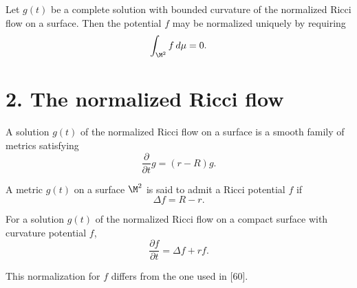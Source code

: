 \begin{lemma}
\label{ch05-lem-potential-normalization}

Let \(g(t)\) be a complete solution with bounded curvature of the normalized Ricci flow on a surface. Then the potential \(f\) may be normalized uniquely by requiring
\[
\int_{\M^2} f\,d\mu = 0.
\]
\end{lemma}

\section*{2. The normalized Ricci flow}

\begin{definition}
\label{ch05-def-normalized-flow}

A solution \(g(t)\) of the normalized Ricci flow on a surface is a smooth family of metrics satisfying
\[
\frac{\partial}{\partial t}g=(r-R)g.
\]
\end{definition}

\begin{definition}
\label{ch05-def-ricci-potential}

A metric \(g(t)\) on a surface \(\M^2\) is said to admit a Ricci potential \(f\) if
\[
\Delta f=R-r.
\]
\end{definition}

\begin{lemma}
\label{ch05-lem-potential-equation}

For a solution \(g(t)\) of the normalized Ricci flow on a compact surface with curvature potential \(f\),
\[
\frac{\partial f}{\partial t}=\Delta f + r f.
\]
\end{lemma}

\begin{remark}
\label{ch05-rem-potential-normalization}

This normalization for \(f\) differs from the one used in [60].
\end{remark}

